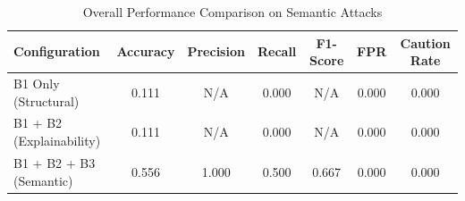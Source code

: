 \begin{table}[h]
\centering
\caption{Overall Performance Comparison on Semantic Attacks}
\label{tab:semantic_results}
\begin{tabular}{lcccccc}
\hline
\textbf{Configuration} & \textbf{Accuracy} & \textbf{Precision} & \textbf{Recall} & \textbf{F1-Score} & \textbf{FPR} & \textbf{Caution Rate} \\ \hline
B1 Only (Structural) & 0.111 & N/A & 0.000 & N/A & 0.000 & 0.000 \\
B1 + B2 (Explainability) & 0.111 & N/A & 0.000 & N/A & 0.000 & 0.000 \\
B1 + B2 + B3 (Semantic) & 0.556 & 1.000 & 0.500 & 0.667 & 0.000 & 0.000 \\
\hline
\end{tabular}
\end{table}
